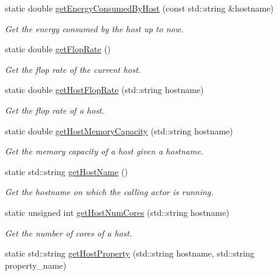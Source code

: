 \begin{DoxyCompactItemize}
static double \hyperlink{classwrench_1_1_s4_u___simulation_a88c0d6933d98a0c3330f62139ac9f6d5}{get\+Energy\+Consumed\+By\+Host} (const std\+::string \&hostname)
\begin{DoxyCompactList}\small\item\em Get the energy consumed by the host up to now. \end{DoxyCompactList}\item 
static double \hyperlink{classwrench_1_1_s4_u___simulation_a37ddab7be97c813bcf5e02bd512cd519}{get\+Flop\+Rate} ()
\begin{DoxyCompactList}\small\item\em Get the flop rate of the current host. \end{DoxyCompactList}\item 
static double \hyperlink{classwrench_1_1_s4_u___simulation_a6ced6004e86834c5f89f553a17d8cb64}{get\+Host\+Flop\+Rate} (std\+::string hostname)
\begin{DoxyCompactList}\small\item\em Get the flop rate of a host. \end{DoxyCompactList}\item 
static double \hyperlink{classwrench_1_1_s4_u___simulation_a5619ac678a185fd7031d6f13d7ec463a}{get\+Host\+Memory\+Capacity} (std\+::string hostname)
\begin{DoxyCompactList}\small\item\em Get the memory capacity of a host given a hostname. \end{DoxyCompactList}\item 
static std\+::string \hyperlink{classwrench_1_1_s4_u___simulation_aa79d6550a2d924c37f6f58533d15518e}{get\+Host\+Name} ()
\begin{DoxyCompactList}\small\item\em Get the hostname on which the calling actor is running. \end{DoxyCompactList}\item 
static unsigned int \hyperlink{classwrench_1_1_s4_u___simulation_a1f64ef3a7e311e360ce7581e051b58fd}{get\+Host\+Num\+Cores} (std\+::string hostname)
\begin{DoxyCompactList}\small\item\em Get the number of cores of a host. \end{DoxyCompactList}\item 
static std\+::string \hyperlink{classwrench_1_1_s4_u___simulation_a5321cc7b90ea82a95357695cad1b8370}{get\+Host\+Property} (std\+::string hostname, std\+::string property\+\_\+name)

\end{DoxyCompactItemize}
